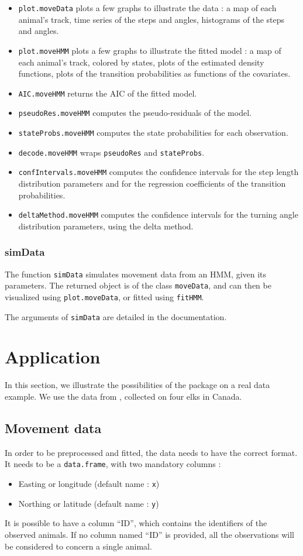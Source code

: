 \documentclass[]{article}
\begin{document}
\begin{itemize}
	\item \texttt{plot.moveData} plots a few graphs to illustrate the data : a map of each animal's track, time series of the steps and angles, histograms of the steps and angles.
	\item \texttt{plot.moveHMM} plots a few graphs to illustrate the fitted model : a map of each animal's track, colored by states, plots of the estimated density functions, plots of the transition probabilities as functions of the covariates.
	\item \texttt{AIC.moveHMM} returns the AIC of the fitted model.
	\item \texttt{pseudoRes.moveHMM} computes the pseudo-residuals of the model.
	\item \texttt{stateProbs.moveHMM} computes the state probabilities for each observation.
	\item \texttt{decode.moveHMM} wraps \texttt{pseudoRes} and \texttt{stateProbs}.
	\item \texttt{confIntervals.moveHMM} computes the confidence intervals for the step length distribution parameters and for the regression coefficients of the transition probabilities.
	\item \texttt{deltaMethod.moveHMM} computes the confidence intervals for the turning angle distribution parameters, using the delta method.
\end{itemize} 

\subsubsection{simData}
The function \texttt{simData} simulates movement data from an HMM, given its parameters. The returned object is of the class \texttt{moveData}, and can then be visualized using \texttt{plot.moveData}, or fitted using \texttt{fitHMM}.

The arguments of \texttt{simData} are detailed in the documentation.

\section{Application} \label{application}
In this section, we illustrate the possibilities of the package on a real data example. We use the data from \cite{morales2004}, collected on four elks in Canada. 

\subsection{Movement data}
In order to be preprocessed and fitted, the data needs to have the correct format. It needs to be a \texttt{data.frame}, with two mandatory columns :
\begin{itemize}
	\item Easting or longitude (default name : \texttt{x})
	\item Northing or latitude (default name : \texttt{y})
\end{itemize}
It is possible to have a column ``ID'', which contains the identifiers of the observed animals. If no column named ``ID'' is provided, all the observations will be considered to concern a single animal.
\end{document}
